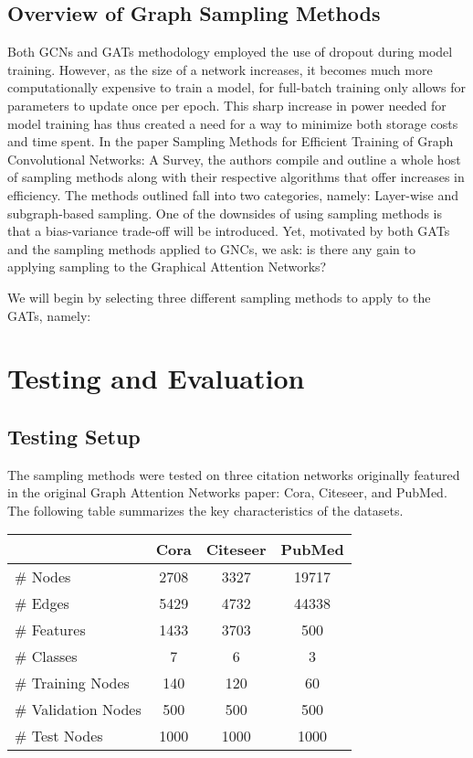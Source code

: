 \documentclass{article}
\begin{document}
	\subsection{Overview of Graph Sampling Methods} 
	
	Both GCNs and GATs methodology employed the use of dropout during model training. However, as the size of a network increases,
	it becomes much more computationally expensive to train a model, for full-batch training only allows for parameters to update once per epoch. This sharp increase in power needed for model training has thus created a need for a way to minimize both storage costs and time spent.
	In the paper Sampling Methods for Efficient Training of Graph Convolutional Networks: A Survey, the authors compile and outline a whole host 
	of sampling methods along with their respective algorithms that offer increases in efficiency. The methods outlined fall into two categories, namely: Layer-wise and subgraph-based sampling. One of the downsides of using sampling methods
	is that a bias-variance trade-off will be introduced. Yet, motivated by both GATs and the sampling methods applied to GNCs, we ask: is there any gain to applying sampling to the Graphical Attention Networks?
	
	We will begin by selecting three different sampling methods to apply to the GATs, namely: 
	
	\section{Testing and Evaluation}
	
	\subsection{Testing Setup}
	
	The sampling methods were tested on three citation networks originally featured in the original Graph Attention Networks paper: Cora, Citeseer, and PubMed. The following table summarizes the key characteristics of the datasets. 
	
	\begin{center}
		\begin{tabular}{|l|c|c|c|}
			\hline
			& Cora & Citeseer & PubMed \\ \hline
			\# Nodes            & 2708 & 3327     & 19717  \\ \hline
			\# Edges            & 5429 & 4732     & 44338  \\ \hline
			\# Features         & 1433 & 3703     & 500    \\ \hline
			\# Classes          & 7    & 6        & 3      \\ \hline
			\# Training Nodes   & 140  & 120      & 60     \\ \hline
			\# Validation Nodes & 500  & 500      & 500    \\ \hline
			\# Test Nodes       & 1000 & 1000     & 1000   \\ \hline
		\end{tabular}
	\end{center}
	
\end{document}
